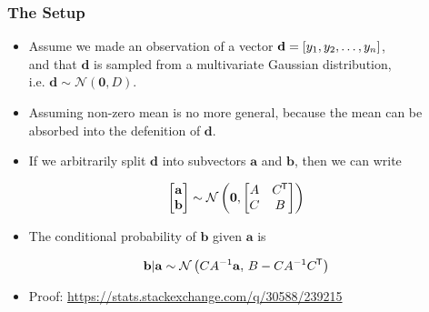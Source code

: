 \renewcommand{\vec}[1]{\mathbf{#1}}
\newcommand{\N}[1]{\mathcal{N}\left(#1\right)}
\newcommand*{\T}{^{\mkern-1.5mu\mathsf{T}}}
\newcommand{\ud}[1]{\underline{\smash{#1}}}



\begin{frame} \frametitle{The Setup}
  \begin{itemize}
    \item Assume we made an observation of a vector
      $\vec{d} = [y_1,y_2,\mathellipsis,y_n]$,\\
      and that $\vec{d}$ is sampled from a multivariate Gaussian
      distribution,\\i.e. $\vec{d}\sim\N{\vec{0},D}$.
    \vspace{1mm}
    \item Assuming non-zero mean is no more general, because the mean can be
      absorbed into the defenition of $\vec{d}$.
    \vspace{1mm}
    \item If we arbitrarily split $\vec{d}$ into subvectors
      $\vec{a}$ and $\vec{b}$, then we can write
  \end{itemize}
  \begin{equation}\label{eq:n1}
    \begin{bmatrix} \vec{a} \\ \vec{b} \end{bmatrix} \sim
      \N{\vec{0},\begin{bmatrix} A & C\T \\ C & B \end{bmatrix}}
  \end{equation}
  \begin{itemize}
    \item The conditional probability of $\vec{b}$ given $\vec{a}$ is
  \end{itemize}
  \begin{equation}
    \vec{b}|\vec{a} \sim \N{CA^{-1}\vec{a},\,B-CA^{-1}C\T}
  \end{equation}
  \vspace{-3mm}
  \begin{itemize}
    \item Proof: {\small\url{https://stats.stackexchange.com/q/30588/239215}}
  \end{itemize}
\end{frame}

